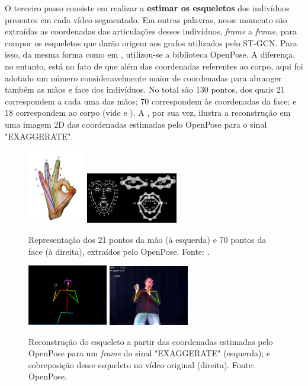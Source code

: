 O terceiro passo consiste em realizar a \textbf{estimar os esqueletos} dos indivíduos presentes em cada vídeo segmentado. Em outras palavras, nesse momento são extraídas as coordenadas das articulações desses indivíduos, \textit{frame} a \textit{frame}, para compor os esqueletos que darão origem aos grafos utilizados pelo ST-GCN. Para isso, da mesma forma como em \cite{st-gcn-2018}, utilizou-se a biblioteca OpenPose. A diferença, no entanto, está no fato de que além das coordenadas referentes ao corpo, aqui foi adotado um número consideravelmente maior de coordenadas para abranger também as mãos e face dos indivíduos. No total são 130 pontos, dos quais 21 correspondem a cada uma das mãos; 70 correspondem às coordenadas da face; e 18 correspondem ao corpo (vide  e ). A , por sua vez, ilustra a reconstrução em uma imagem 2D das coordenadas estimadas pelo OpenPose para o sinal "EXAGGERATE".


\begin{figure}[ht]
    \centering
    \includegraphics[width=2.5cm]{images/keypoints_hand}
    \includegraphics[width=4cm]{images/keypoints_face}
    \caption{Representação dos 21 pontos da mão (à esquerda) e 70 pontos da face (à direita), extraídos pelo OpenPose. Fonte: \cite{openpose-output-2018}.}
    \label{fig:keypoints-face-hand}
\end{figure}

\begin{figure}[ht]
    \centering
    \includegraphics[width=3.5cm]{images/sign_pose}
    \includegraphics[width=3.5cm]{images/sign_pose_blended}
    \caption{Reconstrução do esqueleto a partir das coordenadas estimadas pelo OpenPose para um \textit{frame} do sinal "EXAGGERATE" (esquerda); e sobreposição desse esqueleto no vídeo original (direita). Fonte: OpenPose.}
    \label{fig:sign-pose}
\end{figure}

